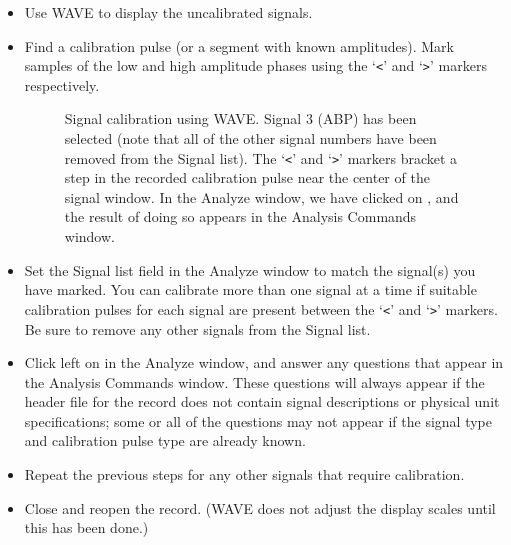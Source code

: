 \documentclass[twoside]{book}
\newcommand{\button}[1]{\cornersize{2}\ovalbox{\rule[-.3mm]{0cm}{2.5mm}\small\sf ~#1~}}
\newcommand{\WAVE}{{\sf WAVE}\xspace}
\begin{document}
\begin{itemize}

\item
Use \WAVE{} to display the uncalibrated signals.

\item
Find a calibration pulse (or a segment with known amplitudes).  Mark samples
of the low and high amplitude phases using the `{\tt <}' and `{\tt >}' markers
respectively.
\begin{figure}
\centerline{}
\caption[Signal calibration.]{Signal calibration using \WAVE{}.
Signal 3 (ABP) has been selected (note that all of the other signal
numbers have been removed from the {\sf Signal list}).  The `{\tt <}'
and `{\tt >}' markers bracket a step in the recorded calibration
pulse near the center of the signal window.  In the {\sf Analyze}
window, we have clicked on \button{Calibrate}, and the result of doing
so appears in the {\sf Analysis Commands} window.}
\label{fig:calibration}
\begin{htmlonly}
\end{htmlonly}
\begin{latexonly}
\end{latexonly}
\end{figure}

\item
Set the {\sf Signal list} field in the {\sf Analyze} window to match
the signal(s) you have marked.  You can calibrate more than one signal
at a time if suitable calibration pulses for each signal are present
between the `{\tt <}' and `{\tt >}' markers.  Be sure to remove any
other signals from the {\sf Signal list}.

\item
Click left on \button{Calibrate} in the {\sf Analyze} window, and
answer any questions that appear in the {\sf Analysis Commands}
window.  These questions will always appear if the header file for the
record does not contain signal descriptions or physical unit
specifications; some or all of the questions may not appear if the
signal type and calibration pulse type are already known.

\item
Repeat the previous steps for any other signals that require calibration.

\item
Close and reopen the record.  (\WAVE{} does not adjust the display scales
until this has been done.)

\end{itemize}
\end{document}

